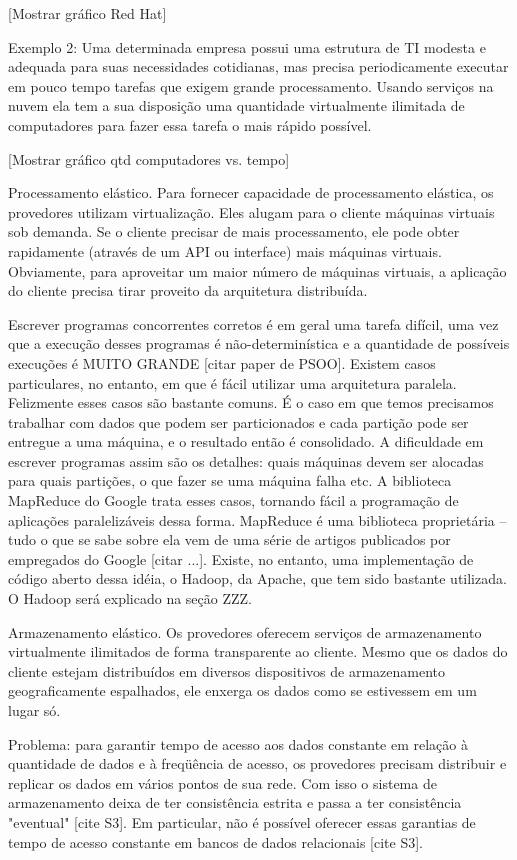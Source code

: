 [Mostrar gráfico Red Hat]

Exemplo 2: Uma determinada empresa possui uma estrutura de TI modesta e adequada para suas necessidades cotidianas, mas precisa periodicamente executar em pouco tempo tarefas que exigem grande processamento. Usando serviços na nuvem ela tem a sua disposição uma quantidade virtualmente ilimitada de computadores para fazer essa tarefa o mais rápido possível.

[Mostrar gráfico qtd computadores vs. tempo]

Processamento elástico. Para fornecer capacidade de processamento elástica, os provedores utilizam virtualização. Eles alugam para o cliente máquinas virtuais sob demanda. Se o cliente precisar de mais processamento, ele pode obter rapidamente (através de um API ou interface) mais máquinas virtuais. Obviamente, para aproveitar um maior número de máquinas virtuais, a aplicação do cliente precisa tirar proveito da arquitetura distribuída.

Escrever programas concorrentes corretos é em geral uma tarefa difícil, uma vez que a execução desses programas é não-determinística e a quantidade de possíveis execuções é MUITO GRANDE [citar paper de PSOO]. Existem casos particulares, no entanto, em que é fácil utilizar uma arquitetura paralela. Felizmente esses casos são bastante comuns. É o caso em que temos precisamos trabalhar com dados que podem ser particionados e cada partição pode ser entregue a uma máquina, e o resultado então é consolidado. A dificuldade em escrever programas assim são os detalhes: quais máquinas devem ser alocadas para quais partições, o que fazer se uma máquina falha etc. A biblioteca MapReduce do Google trata esses casos, tornando fácil a programação de aplicações paralelizáveis dessa forma. MapReduce é uma biblioteca proprietária -- tudo o que se sabe sobre ela vem de uma série de artigos publicados por empregados do Google [citar ...]. Existe, no entanto, uma implementação de código aberto dessa idéia, o Hadoop, da Apache, que tem sido bastante utilizada. O Hadoop será explicado na seção ZZZ.

Armazenamento elástico. Os provedores oferecem serviços de armazenamento virtualmente ilimitados de forma transparente ao cliente. Mesmo que os dados do cliente estejam distribuídos em diversos dispositivos de armazenamento geograficamente espalhados, ele enxerga os dados como se estivessem em um lugar só.

Problema: para garantir tempo de acesso aos dados constante em relação à quantidade de dados e à freqüência de acesso, os provedores precisam distribuir e replicar os dados em vários pontos de sua rede. Com isso o sistema de armazenamento deixa de ter consistência estrita e passa a ter consistência "eventual" [cite S3]. Em particular, não é possível oferecer essas garantias de tempo de acesso constante em bancos de dados relacionais [cite S3].


